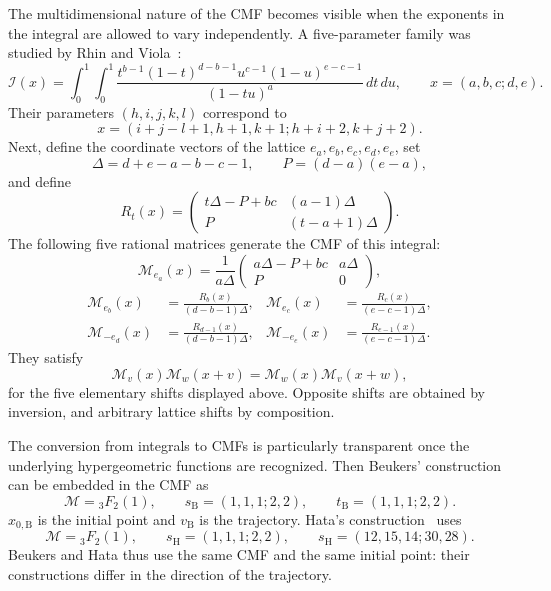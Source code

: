 \documentclass[oneside,english,11pt]{amsart}
\begin{document}
The multidimensional nature of the CMF becomes visible when the exponents in the integral are allowed to vary independently. A five-parameter family was studied by Rhin and Viola~\cite[Eq.~(1.4)]{rhin1996permutation}:
\begin{equation}
 \mathcal I(x)=\int_0^1\!\int_0^1
 \frac{t^{b-1}(1-t)^{d-b-1}
       u^{c-1}(1-u)^{e-c-1}}
      {(1-tu)^a}\,dt\,du,
 \qquad x=(a,b,c;d,e).
 \label{eq:five-parameter-beukers-integral}
\end{equation}
Their parameters $(h,i,j,k,l)$ correspond to
\[
 x=(i+j-l+1,h+1,k+1;h+i+2,k+j+2).
\]
Next, define the coordinate vectors of the lattice $e_a,e_b,e_c,e_d,e_e$, 
set
\[
 \Delta=d+e-a-b-c-1,
 \qquad P=(d-a)(e-a),
\]
and define
\[
 R_t(x)=
 \begin{pmatrix}
 t\Delta-P+bc & (a-1)\Delta\\
 P & (t-a+1)\Delta
 \end{pmatrix}.
\]
The following five rational matrices generate the CMF of this integral:
\begin{equation}
 \mathcal M_{e_a}(x)=\frac{1}{a\Delta}
 \begin{pmatrix}
 a\Delta-P+bc & a\Delta\\
 P & 0
 \end{pmatrix},
 \label{eq:integral-cmf-a-shift}
\end{equation}
\begin{equation}
 \begin{aligned}
 \mathcal M_{e_b}(x)&=\frac{R_b(x)}{(d-b-1)\Delta},
 &\mathcal M_{e_c}(x)&=\frac{R_c(x)}{(e-c-1)\Delta},\\[3pt]
 \mathcal M_{-e_d}(x)&=\frac{R_{d-1}(x)}{(d-b-1)\Delta},
 &\mathcal M_{-e_e}(x)&=\frac{R_{e-1}(x)}{(e-c-1)\Delta}.
 \end{aligned}
 \label{eq:integral-cmf-other-shifts}
\end{equation}
They satisfy
\[
 \mathcal M_v(x)\mathcal M_w(x+v)
 =\mathcal M_w(x)\mathcal M_v(x+w),
\]
for the five elementary shifts displayed above. Opposite shifts are obtained
by inversion, and arbitrary lattice shifts by composition. 

The conversion from integrals to CMFs is particularly transparent once the underlying hypergeometric functions are recognized.
Then Beukers' construction can be embedded in the CMF as
\begin{equation}
 \boxed{
 \mathcal M={}_3F_2(1),\qquad
 s_{\mathrm B}=(1,1,1;2,2),\qquad
 t_{\mathrm B}=(1,1,1;2,2).
 }
\end{equation}
$x_{0,\mathrm B}$ is the initial point and $v_{\mathrm B}$ is the trajectory.
Hata's construction~\cite[Eq.~(1.2)]{hata1995beukers} uses
\begin{equation}
 \boxed{
 \mathcal M={}_3F_2(1),\qquad
 s_{\mathrm H}=(1,1,1;2,2),\qquad
 s_{\mathrm H}=(12,15,14;30,28).
 }
 \label{eq:hata-cmf-data}
\end{equation}
Beukers and Hata thus use the same CMF and the same initial point:
their constructions differ in the direction of the trajectory.
\end{document}
